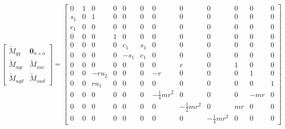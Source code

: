 \documentclass[smallcondensed]{svjour3}                     %
\begin{document}
\begin{equation}
  \left[
    \begin{array}{cc}
      \tilde{M}_{qq} & \bm{0}_{n \times o} \\
      \tilde{M}_{uqc} & \tilde{M}_{uuc} \\
      \tilde{M}_{uqd} & \tilde{M}_{uud}
    \end{array}
    \right]=
\left[\begin{smallmatrix}0 & 1 & 0 & 0 & 0 & 0 & 0 & 0 & 0 & 0 & 0 & 0\\s_{1} & 0 & 1 & 0 & 0 & 0 & 0 & 0 & 0 & 0 & 0 & 0\\c_{1} & 0 & 0 & 0 & 0 & 0 & 0 & 0 & 0 & 0 & 0 & 0\\0 & 0 & 0 & 1 & 0 & 0 & 0 & 0 & 0 & 0 & 0 & 0\\0 & 0 & 0 & 0 & c_{1} & s_{1} & 0 & 0 & 0 & 0 & 0 & 0\\0 & 0 & 0 & 0 & - s_{1} & c_{1} & 0 & 0 & 0 & 0 & 0 & 0\\0 & 0 & 0 & 0 & 0 & 0 & 0 & r & 0 & 1 & 0 & 0\\0 & 0 & - r u_{2} & 0 & 0 & 0 & - r & 0 & 0 & 0 & 1 & 0\\0 & 0 & r u_{1} & 0 & 0 & 0 & 0 & 0 & 0 & 0 & 0 & 1\\0 & 0 & 0 & 0 & 0 & 0 & - \frac{1}{4} m r^{2} & 0 & 0 & 0 & - m r & 0\\0 & 0 & 0 & 0 & 0 & 0 & 0 & - \frac{1}{2} m r^{2} & 0 & m r & 0 & 0\\0 & 0 & 0 & 0 & 0 & 0 & 0 & 0 & - \frac{1}{4} m r^{2} & 0 & 0 & 0\end{smallmatrix}\right]
\end{equation}
\end{document}

